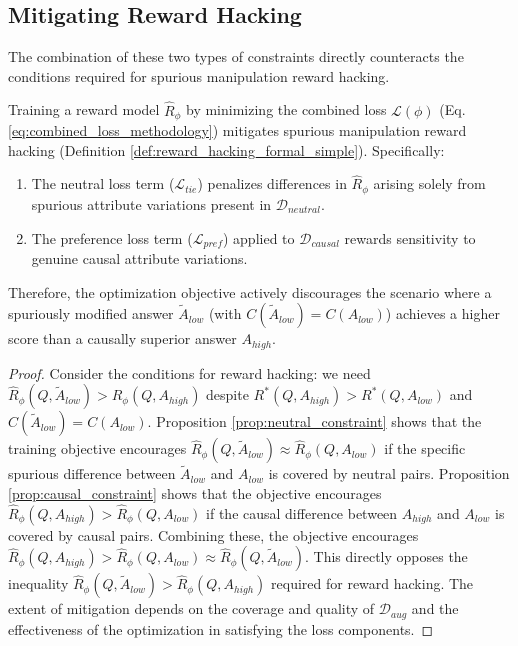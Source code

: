 \subsection{Mitigating Reward Hacking}

The combination of these two types of constraints directly counteracts the conditions required for spurious manipulation reward hacking.

\begin{theorem}
\label{thm:mitigation}
Training a reward model $\hat{R}_\phi$ by minimizing the combined loss $\mathcal{L}(\phi)$ (Eq. \ref{eq:combined_loss_methodology}) mitigates spurious manipulation reward hacking (Definition \ref{def:reward_hacking_formal_simple}). Specifically:
\begin{enumerate}
    \item The neutral loss term ($\mathcal{L}_{tie}$) penalizes differences in $\hat{R}_\phi$ arising solely from spurious attribute variations present in $\mathcal{D}_{neutral}$.
    \item The preference loss term ($\mathcal{L}_{pref}$) applied to $\mathcal{D}_{causal}$ rewards sensitivity to genuine causal attribute variations.
\end{enumerate}
Therefore, the optimization objective actively discourages the scenario where a spuriously modified answer $\tilde{A}_{low}$ (with $C(\tilde{A}_{low}) = C(A_{low})$) achieves a higher score than a causally superior answer $A_{high}$.

\begin{proof}
Consider the conditions for reward hacking: we need $\hat{R}_\phi(Q, \tilde{A}_{low}) > \hat{R}_\phi(Q, A_{high})$ despite $R^*(Q, A_{high}) > R^*(Q, A_{low})$ and $C(\tilde{A}_{low}) = C(A_{low})$.
Proposition \ref{prop:neutral_constraint} shows that the training objective encourages $\hat{R}_\phi(Q, \tilde{A}_{low}) \approx \hat{R}_\phi(Q, A_{low})$ if the specific spurious difference between $\tilde{A}_{low}$ and $A_{low}$ is covered by neutral pairs.
Proposition \ref{prop:causal_constraint} shows that the objective encourages $\hat{R}_\phi(Q, A_{high}) > \hat{R}_\phi(Q, A_{low})$ if the causal difference between $A_{high}$ and $A_{low}$ is covered by causal pairs.
Combining these, the objective encourages $\hat{R}_\phi(Q, A_{high}) > \hat{R}_\phi(Q, A_{low}) \approx \hat{R}_\phi(Q, \tilde{A}_{low})$. This directly opposes the inequality $\hat{R}_\phi(Q, \tilde{A}_{low}) > \hat{R}_\phi(Q, A_{high})$ required for reward hacking. The extent of mitigation depends on the coverage and quality of $\mathcal{D}_{aug}$ and the effectiveness of the optimization in satisfying the loss components.
\end{proof}
\end{theorem}

